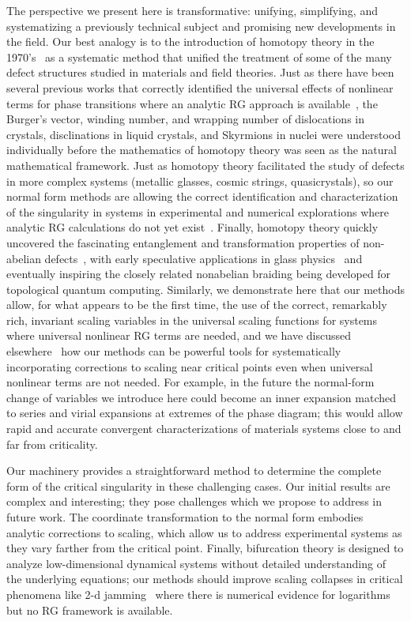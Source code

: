 \documentclass[
 reprint,
 amsmath,amssymb,
 aps, superscriptaddress, pre
]{revtex4-1}
\begin{document}
The perspective we present here is transformative: unifying, simplifying,
and systematizing a previously technical subject and promising new developments
in the field. Our best analogy is to the introduction of homotopy theory in the
1970's~\cite{toulouse1976principles,rogula1976large,Merm79,GoldbartK19} 
as a systematic method that unified the treatment of some of the many defect
structures studied in materials and field theories. Just as there have
been several previous works that correctly identified the universal effects
of nonlinear terms for phase transitions where an analytic RG 
approach is available~\cite{Wegner72,Meinke05,sonoda,magradze,pelissetto2013renormalization, barma1984corrections, barma1985two, hasenbusch2008universal, Salas97}, the 
Burger's vector, winding number, and wrapping number of dislocations in 
crystals, disclinations in liquid crystals, and Skyrmions in nuclei were 
understood individually before the mathematics of homotopy theory was seen
as the natural mathematical framework. Just as homotopy theory facilitated the
study of defects in more complex systems (metallic glasses, cosmic strings,
quasicrystals), so our normal
form methods are allowing the correct identification
and characterization of the singularity in systems in experimental and 
numerical explorations where analytic RG calculations do not yet
exist~\cite{Lorien17}. Finally, homotopy theory quickly uncovered
the fascinating entanglement and transformation properties of non-abelian
defects~\cite{Merm79}, with early speculative applications in glass
physics~\cite{Nelson83} and eventually 
inspiring the closely related nonabelian braiding being developed for 
topological quantum computing. Similarly, we demonstrate here that our methods
allow, for what appears to be the first time, the use of the correct,
remarkably rich, invariant scaling variables in the universal scaling
functions for systems where universal nonlinear RG terms are needed, and
we have discussed elsewhere~\cite{raju2018reexamining} how our methods can
be powerful tools for systematically incorporating corrections to
scaling near critical points even when universal nonlinear terms are not
needed. For example, in the future the normal-form change of variables 
we introduce here could become an inner expansion matched to 
series and virial expansions at extremes of the phase diagram; this would
allow rapid and accurate convergent characterizations of materials systems
close to and far from criticality.

Our machinery provides a
straightforward method to determine the complete form of the critical
singularity in these challenging cases. Our initial results are complex and
interesting; they pose challenges which we propose to address in future
work. The coordinate transformation to the normal form embodies analytic corrections to scaling, which allow us to address experimental
systems as they vary farther from the critical point. Finally, bifurcation theory
is designed to analyze low-dimensional dynamical systems without detailed understanding of the underlying equations;
our methods should improve scaling collapses in critical phenomena
like 2-d jamming~\cite{goodrich2014jamming}
where there is numerical evidence for logarithms but no RG framework is available.
\end{document}
